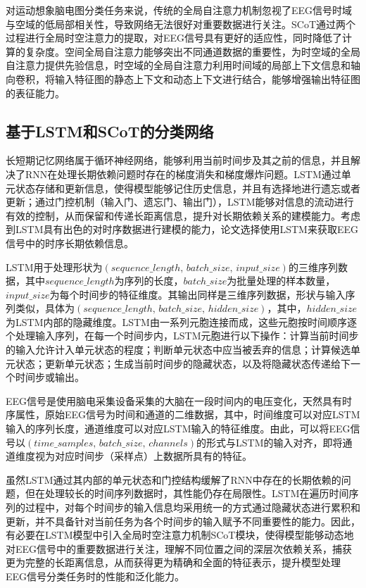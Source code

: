 对运动想象脑电图分类任务来说，传统的全局自注意力机制忽视了EEG信号时域与空域的低局部相关性，导致网络无法很好对重要数据进行关注。SCoT通过两个过程进行全局时空注意力的提取，对EEG信号具有更好的适应性，同时降低了计算的复杂度。空间全局自注意力能够突出不同通道数据的重要性，为时空域的全局自注意力提供先验信息，时空域的全局自注意力利用时间域的局部上下文信息和轴向卷积，将输入特征图的静态上下文和动态上下文进行结合，能够增强输出特征图的表征能力。

\subsection{基于LSTM和SCoT的分类网络}

长短期记忆网络属于循环神经网络，能够利用当前时间步及其之前的信息，并且解决了RNN在处理长期依赖问题时存在的梯度消失和梯度爆炸问题。LSTM通过单元状态存储和更新信息，使得模型能够记住历史信息，并且有选择地进行遗忘或者更新；通过门控机制（输入门、遗忘门、输出门），LSTM能够对信息的流动进行有效的控制，从而保留和传递长距离信息，提升对长期依赖关系的建模能力。考虑到LSTM具有出色的对时序数据进行建模的能力，论文选择使用LSTM来获取EEG信号中的时序长期依赖信息。

LSTM用于处理形状为\((sequence\_length,\, batch\_size,\, input\_size)\)的三维序列数据，其中\(sequence\_length\)为序列的长度，\(batch\_size\)为批量处理的样本数量，\(input\_size\)为每个时间步的特征维度。其输出同样是三维序列数据，形状与输入序列类似，具体为\((sequence\_length,\,batch\_size,\, hidden\_size)\)，其中，\(hidden\_size\)为LSTM内部的隐藏维度。LSTM由一系列元胞连接而成，这些元胞按时间顺序逐个处理输入序列，在每一个时间步内，LSTM元胞进行以下操作：计算当前时间步的输入允许计入单元状态的程度；判断单元状态中应当被丢弃的信息；计算候选单元状态；更新单元状态；生成当前时间步的隐藏状态，以及将隐藏状态传递给下一个时间步或输出。

EEG信号是使用脑电采集设备采集的大脑在一段时间内的电压变化，天然具有时序属性，原始EEG信号为时间和通道的二维数据，其中，时间维度可以对应LSTM输入的序列长度，通道维度可以对应LSTM输入的特征维度。由此，可以将EEG信号以\((time\_samples,\, batch\_size,\, channels)\)的形式与LSTM的输入对齐，即将通道维度视为对应时间步（采样点）上数据所具有的特征。

虽然LSTM通过其内部的单元状态和门控结构缓解了RNN中存在的长期依赖的问题，但在处理较长的时间序列数据时，其性能仍存在局限性。LSTM在遍历时间序列的过程中，对每个时间步的输入信息均采用统一的方式通过隐藏状态进行累积和更新，并不具备针对当前任务为各个时间步的输入赋予不同重要性的能力。因此，有必要在LSTM模型中引入全局时空注意力机制SCoT模块，使得模型能够动态地对EEG信号中的重要数据进行关注，理解不同位置之间的深层次依赖关系，捕获更为完整的长距离信息，从而获得更为精确和全面的特征表示，提升模型处理EEG信号分类任务时的性能和泛化能力。


